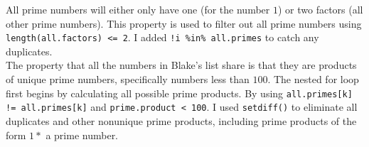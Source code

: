 \documentclass{article}\usepackage[]{graphicx}\usepackage[]{xcolor}
\begin{document}
\begin{enumerate}
All prime numbers will either only have one (for the number $1$) or two factors (all other prime numbers). This property is used to filter out all prime numbers using \verb|length(all.factors) <= 2|. I added \verb|!i %in% all.primes| to catch any duplicates. \\

The property that all the numbers in Blake's list share is that they are products of unique prime numbers, specifically numbers less than $100$. The nested for loop first begins by calculating all possible prime products. By using \verb|all.primes[k] != all.primes[k]| and \verb|prime.product < 100|. I used \verb|setdiff()| to eliminate all duplicates and other nonunique prime products, including prime products of the form $1*$ a prime number. \\


\end{enumerate}
\end{document}
